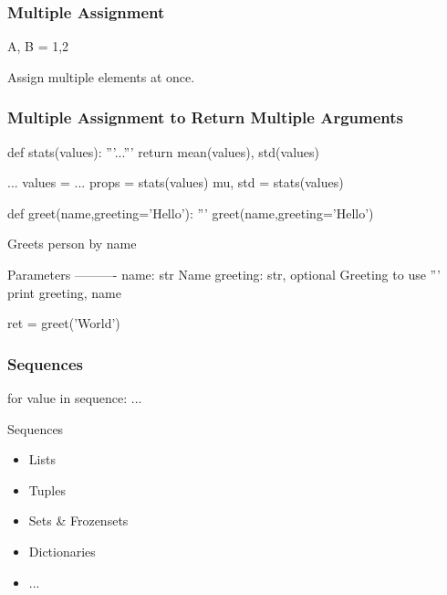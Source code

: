 \begin{frame}[fragile]
\frametitle{Multiple Assignment}

\begin{python}
A, B = 1,2
\end{python}

Assign multiple elements at once.
\end{frame}

\begin{frame}[fragile]
\frametitle{Multiple Assignment to Return Multiple Arguments}

\begin{python}
def stats(values):
    '''...'''
    return mean(values), std(values)

...
values = ...
props = stats(values)
mu, std = stats(values)
\end{python}

\end{frame}

\begin{frame}[fragile]

\begin{python}
def greet(name,greeting='Hello'):
    '''
    greet(name,greeting='Hello')

    Greets person by name

    Parameters
    ----------
    name: str
        Name
    greeting: str, optional
        Greeting to use
    '''
    print greeting, name

ret = greet('World')

\end{python}

\end{frame}

\begin{frame}[fragile]
\frametitle{Sequences}

\begin{python}
for value in sequence:
    ...
\end{python}

\begin{block}{Sequences}
\begin{itemize}
\item Lists
\item Tuples
\item Sets \& Frozensets
\item Dictionaries
\item ...
\end{itemize}
\end{block}
\end{frame}


